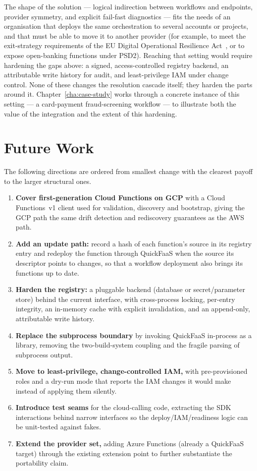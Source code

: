 The shape of the solution --- logical indirection between workflows and endpoints, provider
symmetry, and explicit fail-fast diagnostics --- fits the needs of an organisation that deploys the same
orchestration to several accounts or projects, and that must be able to move it to another provider
(for example, to meet the exit-strategy requirements of the EU Digital Operational Resilience
Act~\cite{dora2022}, or to expose open-banking functions under PSD2). Reaching that
setting would require hardening the gaps above: a signed, access-controlled registry backend, an
attributable write history for audit, and least-privilege IAM under change control. None of these
changes the resolution cascade itself; they harden the parts around it.
Chapter~\ref{cha:case-study} works through a concrete instance of this setting --- a card-payment
fraud-screening workflow --- to illustrate both the value of the integration and the extent of
this hardening.

\section{Future Work}
\label{sec:concl-future}

The following directions are ordered from smallest change with the clearest payoff to the larger
structural ones.

\begin{enumerate}
  \item \textbf{Cover first-generation Cloud Functions on GCP} with a Cloud Functions~v1 client
  used for validation, discovery and bootstrap, giving the GCP path the same drift detection and
  rediscovery guarantees as the AWS path.
  \item \textbf{Add an update path:} record a hash of each function's source in its registry entry
  and redeploy the function through QuickFaaS when the source its descriptor points to changes, so
  that a workflow deployment also brings its functions up to date.
  \item \textbf{Harden the registry:} a pluggable backend (database or secret/parameter store)
  behind the current interface, with cross-process locking, per-entry integrity, an in-memory
  cache with explicit invalidation, and an append-only, attributable write history.
  \item \textbf{Replace the subprocess boundary} by invoking QuickFaaS in-process as a library,
  removing the two-build-system coupling and the fragile parsing of subprocess output.
  \item \textbf{Move to least-privilege, change-controlled IAM,} with pre-provisioned roles and a
  dry-run mode that reports the IAM changes it would make instead of applying them silently.
  \item \textbf{Introduce test seams} for the cloud-calling code, extracting the SDK interactions
  behind narrow interfaces so the deploy/IAM/readiness logic can be unit-tested against fakes.
  \item \textbf{Extend the provider set,} adding Azure Functions (already a QuickFaaS target)
  through the existing extension point to further substantiate the portability claim.
\end{enumerate}

